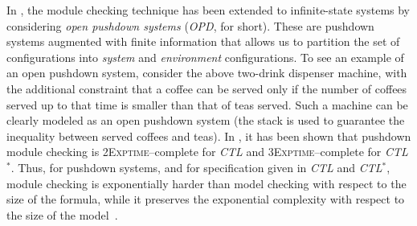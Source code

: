 \documentclass{LMCS}
\theoremstyle{plain}
\def \CTL           {\emph{CTL}\xspace}
\def \CTLSTAR       {\emph{CTL$^*$}\xspace}
\def \OPD           {\emph{OPD}\xspace}
\def \THREEEXPTIME  {\textsc{3Exptime}\xspace}
\def \TWOEXPTIME    {\textsc{2Exptime}\xspace}
\begin{document}
In \cite{BMP05,AMV07}, the module checking technique has been extended to
infinite-state systems by considering \emph{open pushdown systems} (\OPD, for
short). These are pushdown systems augmented with finite information that
allows us to partition the set of configurations into \emph{system} and
\emph{environment} configurations. To see an example of an open pushdown
system, consider the above two-drink dispenser machine, with the additional
constraint that a coffee can be served only if the number of coffees served up
to that time is smaller than that of teas served. Such a machine can be clearly
modeled as an open pushdown system (the stack is used to guarantee the
inequality between served coffees and teas). In \cite{BMP05}, it has been shown
that pushdown module checking is \TWOEXPTIME--complete for \CTL and
\THREEEXPTIME--complete for \CTLSTAR. Thus, for pushdown systems, and for
specification given in \CTL and \CTLSTAR, module checking is exponentially
harder than model checking with respect to the size of the formula, while it
preserves the exponential complexity with respect to the size of the
model~\cite{Wal96,Wal00}.
\end{document}
